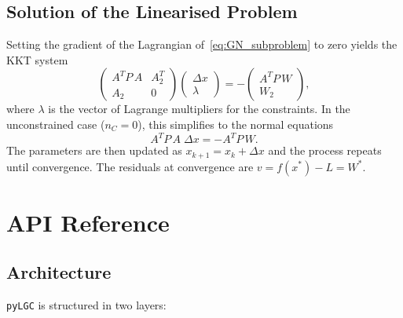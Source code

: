 \documentclass[a4paper,11pt]{article}
\newcommand{\code}[1]{\texttt{#1}}
\begin{document}
\subsection{Solution of the Linearised Problem}

Setting the gradient of the Lagrangian of~\eqref{eq:GN_subproblem} to
zero yields the KKT system
\begin{equation}
  \begin{pmatrix}
    A^T P\, A & A_2^T \\
    A_2       & 0
  \end{pmatrix}
  \begin{pmatrix}
    \Delta x \\ \lambda
  \end{pmatrix}
  = -
  \begin{pmatrix}
    A^T P\, W \\
    W_2
  \end{pmatrix},
  \label{eq:kkt}
\end{equation}
where $\lambda$ is the vector of Lagrange multipliers for the
constraints. In the unconstrained case ($n_C = 0$), this simplifies to
the normal equations
\begin{equation}
    A^T P\, A\;\Delta x = -A^T P\, W.
    \label{eq:normal}
\end{equation}
The parameters are then updated as $x_{k+1} = x_k + \Delta x$ and the
process repeats until convergence. The residuals at convergence are
$v = f(x^*) - L = W^*$.

\section{API Reference}
\label{sec:api}

\subsection{Architecture}
\label{sec:arch}

\code{pyLGC} is structured in two layers:
\end{document}
